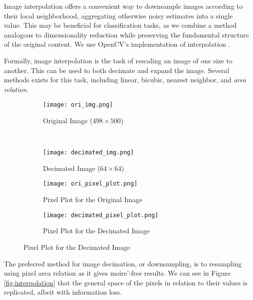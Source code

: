 \documentclass{article}
\begin{document}
Image interpolation offers a convenient way to downsample images according to
their local neighborhood, aggregating otherwise noisy estimates into a single
value. This may be beneficial for classification tasks, as we combine a method
analogous to dimensionality reduction while preserving the fundamental structure of
the original content. We use OpenCV's implementation of interpolation \cite{opencv}.

Formally, image interpolation is the task of rescaling an image of one size
to another. This can be used to both decimate and expand the image. Several
methods exists for this task, including linear, bicubic, nearest neighbor, and
\textit{area relation}.

\begin{figure}[h!]
  \centering
  \caption{Results of Interpolating a 249,000 pixel image to a 4,096 pixel image.}
  \label{fig:interpolation}
  \begin{subfigure}[b]{0.45\textwidth}
    \centering
    \texttt{[image: ori\_img.png]}
    \vspace{-13pt}
    \caption{Original Image ($498 \times 500$)}
    \label{fig:ori-image}
  \end{subfigure}
  ~
  \begin{subfigure}[b]{0.45\textwidth}
    \centering
    \texttt{[image: decimated\_img.png]}
    \vspace{-13pt}
    \caption{Decimated Image ($64 \times 64$)}
    \label{fig:reduced-img}
  \end{subfigure}

  \begin{subfigure}[b]{1.\textwidth}
    \centering
    \texttt{[image: ori\_pixel\_plot.png]}
    \caption{Pixel Plot for the Original Image}
    \label{fig:ori-pixel-plot}
  \end{subfigure}

  \begin{subfigure}[b]{1.\textwidth}
    \centering
    \texttt{[image: decimated\_pixel\_plot.png]}
    \caption{Pixel Plot for the Decimated Image}
    \label{fig:reduced-pixel-plot}
  \end{subfigure}
\end{figure}

The preferred method for image decimation, or downsampling, is to
resampling using pixel area relation as it gives moire'-free results. We can
see in Figure \ref{fig:interpolation} that the general space of the pixels in
relation to their values is replicated, albeit with information loss.
\end{document}
